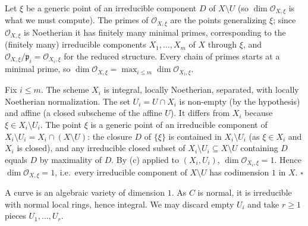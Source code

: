 \documentclass[11pt]{article}
\begin{document}
Let $\xi$ be a generic point of an irreducible component $D$ of $X\setminus U$ (so $\dim\mathcal O_{X,\xi}$ is what we must compute). The primes of $\mathcal O_{X,\xi}$ are the points generalizing $\xi$; since $\mathcal O_{X,\xi}$ is Noetherian it has finitely many minimal primes, corresponding to the (finitely many) irreducible components $X_1,\dots,X_m$ of $X$ through $\xi$, and $\mathcal O_{X,\xi}/\mathfrak p_i=\mathcal O_{X_i,\xi}$ for the reduced structure. Every chain of primes starts at a minimal prime, so $\dim\mathcal O_{X,\xi}=\max_{i\le m}\dim\mathcal O_{X_i,\xi}$.

Fix $i\le m$. The scheme $X_i$ is integral, locally Noetherian, separated, with locally Noetherian normalization. The set $U_i=U\cap X_i$ is non-empty (by the hypothesis) and affine (a closed subscheme of the affine $U$). It differs from $X_i$ because $\xi\in X_i\setminus U_i$. The point $\xi$ is a generic point of an irreducible component of $X_i\setminus U_i=X_i\cap(X\setminus U)$: the closure $D$ of $\{\xi\}$ is contained in $X_i\setminus U_i$ (as $\xi\in X_i$ and $X_i$ is closed), and any irreducible closed subset of $X_i\setminus U_i\subseteq X\setminus U$ containing $D$ equals $D$ by maximality of $D$. By (c) applied to $(X_i,U_i)$, $\dim\mathcal O_{X_i,\xi}=1$. Hence $\dim\mathcal O_{X,\xi}=1$, i.e.\ every irreducible component of $X\setminus U$ has codimension $1$ in $X$. \hfill$\square$

\pf
A curve is an algebraic variety of dimension $1$. As $C$ is normal, it is irreducible with normal local rings, hence integral. We may discard empty $U_i$ and take $r\ge1$ pieces $U_1,\dots,U_r$.
\end{document}
